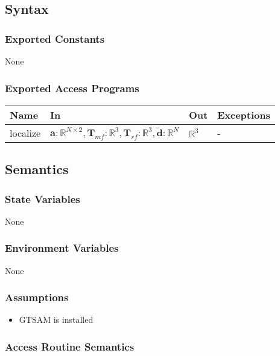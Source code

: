 \documentclass[12pt, titlepage]{article}
\begin{document}
\subsection{Syntax}

\subsubsection{Exported Constants}
None

\subsubsection{Exported Access Programs}

\begin{center}
\begin{tabular}{p{2cm} p{7cm} p{4cm} p{3cm}}
\hline
\textbf{Name} & \textbf{In} & \textbf{Out} & \textbf{Exceptions} \\
\hline
localize & $\mathbf{a}:\mathbb{R}^{N \times 2}, \mathbf{T}_{mf}:\mathbb{R}^3, \mathbf{T}_{rf}: \mathbb{R}^3,\mathbf{\tilde{d}}:\mathbb{R}^N$ & $\mathbb{R}^3$ & - \\
\hline
\end{tabular}
\end{center}

\subsection{Semantics}

\subsubsection{State Variables}
None

\subsubsection{Environment Variables}
None

\subsubsection{Assumptions}
\begin{itemize}
  \item GTSAM is installed
\end{itemize}

\subsubsection{Access Routine Semantics}
\end{document}

